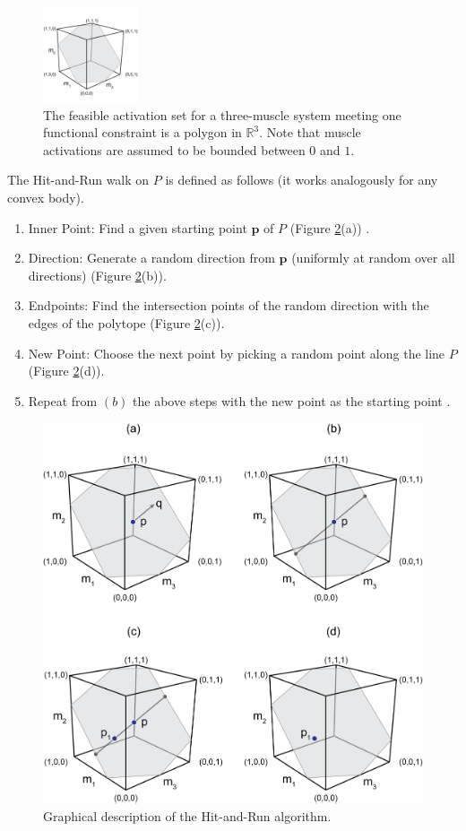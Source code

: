 \begin{figure}[ht]
  \label{fig:fig_hr}
   \begin{center}
    \includegraphics[width=0.25\textwidth]{sections/figs/feasibleactivation.png}
  \end{center}
  \caption{The feasible activation set for a  three-muscle system meeting one functional constraint is a polygon in $\mathbb{R}^3$. Note that muscle activations are assumed to be bounded between $0$ and $1$.}

\end{figure}

The Hit-and-Run walk on $P$ is defined as follows (it works analogously for any convex body). 
\begin{enumerate}
\item Inner Point: Find a given starting point $\textbf{p}$ of $P$ (Figure \ref{fig:hitruncube}(a)) .
\item Direction: Generate a random direction from $\textbf{p}$ (uniformly at random over all directions) (Figure \ref{fig:hitruncube}(b)).
\item Endpoints: Find the intersection points of the random direction with the edges of the polytope (Figure \ref{fig:hitruncube}(c)).
\item New Point: Choose the next point by picking a random point along the line $P$ (Figure \ref{fig:hitruncube}(d)). 
\item Repeat from $(b)$ the above steps with the new point as the starting point .
\end{enumerate}


\begin{figure}[htbp]
\centering
\includegraphics[width=7.5cm\textwidth]{sections/figs/hitruncube.png}
\caption{Graphical description of the Hit-and-Run algorithm.}
\label{fig:hitruncube}
\end{figure}


